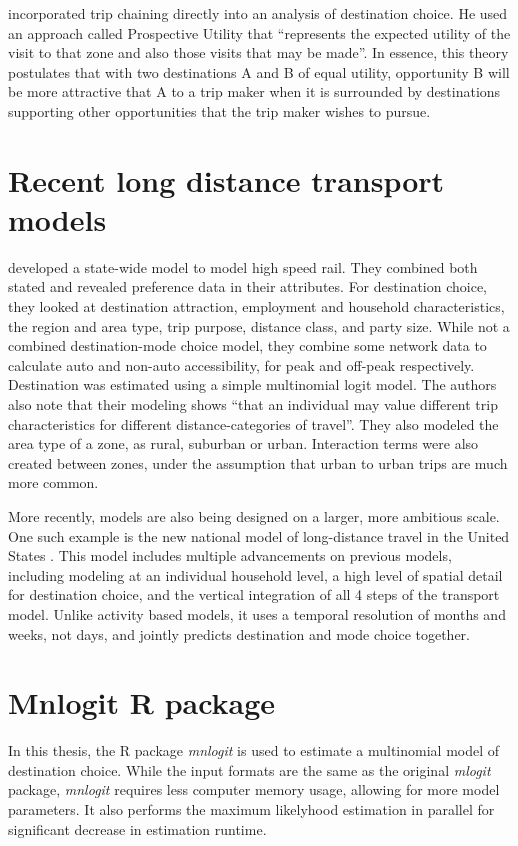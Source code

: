 \textcite{Kitamura84} incorporated trip chaining directly into an analysis of destination choice. He used an approach called Prospective Utility that \enquote{represents the expected utility of the visit to that zone and also those visits that may be made}. In essence, this theory postulates that with two destinations A and B of equal utility, opportunity B will be more attractive that A to a trip maker when it is surrounded by destinations supporting other opportunities that the trip maker wishes to pursue.

\section{Recent long distance transport models}
\autocite{Outwater10} developed a state-wide model to model high speed rail. They combined both stated and revealed preference data in their attributes. For destination choice, they looked at destination attraction, employment and household characteristics, the region and area type, trip purpose, distance class, and party size. While not a combined destination-mode choice model, they combine some network data to calculate auto and non-auto accessibility, for peak and off-peak respectively. Destination was estimated using a simple multinomial logit model. The authors also note that their modeling shows \enquote{that an individual may value different trip characteristics for different distance-categories of travel}. They also modeled the area type of a zone, as rural, suburban or urban. Interaction terms were also created between zones, under the assumption that urban to urban trips are much more common.

More recently, models are also being designed on a larger, more ambitious scale. One such example is the new national model of long-distance travel in the United States \parencite{Outwater15}. This model includes multiple advancements on previous models, including modeling at an individual household level, a high level of spatial detail for destination choice, and the vertical integration of all 4 steps of the transport model. Unlike activity based models, it uses a temporal resolution of months and weeks, not days, and jointly predicts destination and mode choice together. 

\section{Mnlogit R package}
\label{section:mnlogit-structure}
\label{section:mnlogit}
In this thesis, the R package \textit{mnlogit} \parencite{hasan2014fast} is used to estimate a multinomial model of destination choice. While the input formats are the same as the original \textit{mlogit} package, \textit{mnlogit} requires less computer memory usage, allowing for more model parameters. It also performs the maximum likelyhood estimation in parallel for significant decrease in estimation runtime.
